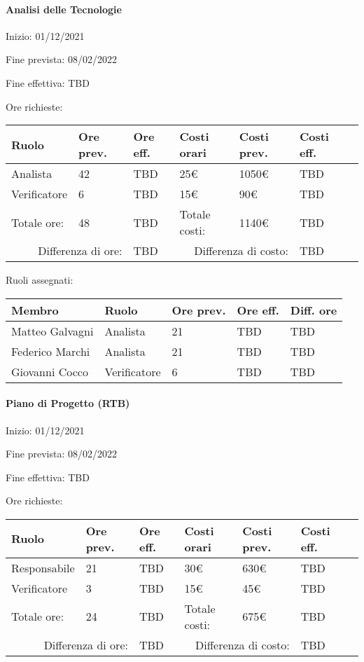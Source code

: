 \documentclass[a4paper, 12pt]{article}
\begin{document}
\paragraph{Analisi delle Tecnologie}
Inizio: 01/12/2021\par
Fine prevista: 08/02/2022\par
Fine effettiva: TBD

Ore richieste:\\[0.5em]
\begin{tabular}{|l|l|l||l|l|l|l|}\hline
Ruolo & Ore prev. & Ore eff. & Costi orari & Costi prev. & Costi eff.\\\hline
Analista & 42 & TBD & 25\euro & 1050\euro & TBD \\\hline
Verificatore & 6 & TBD & 15\euro & 90\euro & TBD \\\hline
Totale ore: & 48 & TBD & Totale costi: & 1140\euro & TBD \\\hline
\multicolumn{2}{|r|}{Differenza di ore:} & TBD & \multicolumn{2}{r|}{Differenza di costo:} & TBD \\\hline
\end{tabular}

Ruoli assegnati:\\[0.5em]
\begin{tabular}{|l|l|l|l|l|}\hline
Membro & Ruolo & Ore prev. & Ore eff. & Diff. ore \\\hline
Matteo Galvagni & Analista & 21 & TBD & TBD \\\hline
Federico Marchi & Analista & 21 & TBD & TBD \\\hline
Giovanni Cocco & Verificatore & 6 & TBD & TBD \\\hline
\end{tabular}

\paragraph{Piano di Progetto (RTB)}
Inizio: 01/12/2021\par
Fine prevista: 08/02/2022\par
Fine effettiva: TBD

Ore richieste:\\[0.5em]
\begin{tabular}{|l|l|l||l|l|l|l|}\hline
Ruolo & Ore prev. & Ore eff. & Costi orari & Costi prev. & Costi eff.\\\hline
Responsabile & 21 & TBD & 30\euro & 630\euro & TBD \\\hline
Verificatore & 3 & TBD & 15\euro & 45\euro & TBD \\\hline
Totale ore: & 24 & TBD & Totale costi: & 675\euro & TBD \\\hline
\multicolumn{2}{|r|}{Differenza di ore:} & TBD & \multicolumn{2}{r|}{Differenza di costo:} & TBD \\\hline
\end{tabular}
\end{document}
